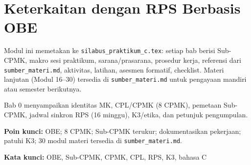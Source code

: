 \documentclass[../main.tex]{subfiles}
\begin{document}
\section{Keterkaitan dengan RPS Berbasis OBE}

Modul ini memetakan ke \texttt{silabus\_praktikum\_c.tex}: setiap bab berisi Sub-CPMK, makro sesi praktikum, sarana/prasarana, prosedur kerja, referensi dari \texttt{sumber\_materi.md}, aktivitas, latihan, asesmen formatif, checklist. Materi lanjutan (Modul 16--30) tersedia di \texttt{sumber\_materi.md} untuk pengayaan mandiri atau semester berikutnya.

\begin{rangkuman}
Bab 0 menyampaikan identitas MK, CPL/CPMK (8 CPMK), pemetaan Sub-CPMK, jadwal sinkron RPS (16 minggu), K3/etika, dan petunjuk pengumpulan.

\textbf{Poin kunci:} OBE; 8 CPMK; Sub-CPMK terukur; dokumentasikan pekerjaan; patuhi K3; 30 modul materi tersedia di \texttt{sumber\_materi.md}.

\textbf{Kata kunci:} OBE, Sub-CPMK, CPMK, CPL, RPS, K3, bahasa C
\end{rangkuman}
\end{document}
